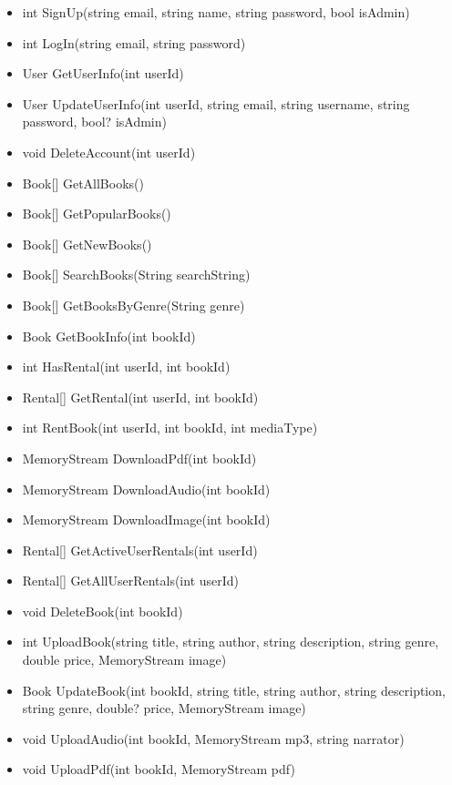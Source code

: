 \documentclass[a4paper,11pt,report]{article}
\begin{document}
\begin{itemize}
	\item int SignUp(string email, string name, string password, bool isAdmin)
	\item int LogIn(string email, string password)
	\item User GetUserInfo(int userId)
	\item User UpdateUserInfo(int userId, string email, string username, string password, bool? isAdmin)
	\item void DeleteAccount(int userId)
	\item Book[] GetAllBooks()
	\item Book[] GetPopularBooks()
	\item Book[] GetNewBooks()
	\item Book[] SearchBooks(String searchString)
	\item Book[] GetBooksByGenre(String genre)
	\item Book GetBookInfo(int bookId)
	\item int HasRental(int userId, int bookId)
	\item Rental[] GetRental(int userId, int bookId)
	\item int RentBook(int userId, int bookId, int mediaType)
	\item MemoryStream DownloadPdf(int bookId)
	\item MemoryStream DownloadAudio(int bookId)
	\item MemoryStream DownloadImage(int bookId)
	\item Rental[] GetActiveUserRentals(int userId)
	\item Rental[] GetAllUserRentals(int userId)
	\item void DeleteBook(int bookId)
	\item int UploadBook(string title, string author, string description, string genre, double price, MemoryStream image)
	\item Book UpdateBook(int bookId, string title, string author, string description, string genre, double? price, MemoryStream image)
	\item void UploadAudio(int bookId, MemoryStream mp3, string narrator)
	\item void UploadPdf(int bookId, MemoryStream pdf)
\end{itemize}
\end{document}

